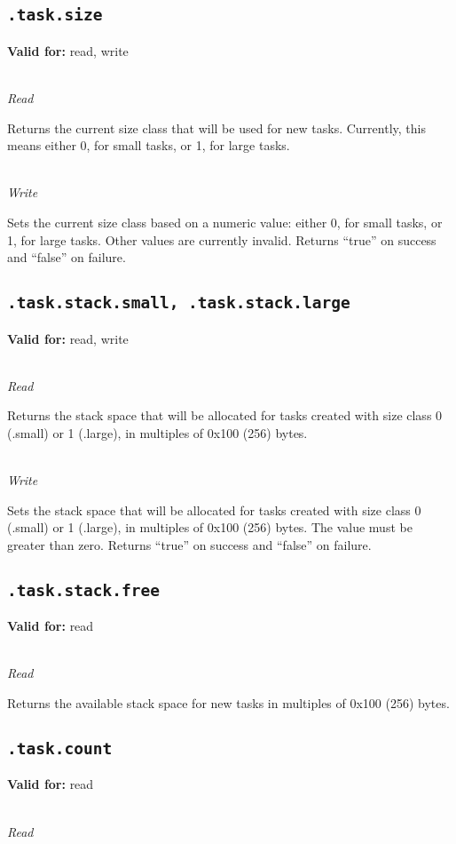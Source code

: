 \documentclass{article}
\begin{document}
\subsection{\texttt{.task.size}}
\textbf{Valid for:} read, write

~\\
\textit{Read}

Returns the current size class that will be used for new tasks. Currently, this means either 0, for small tasks, or 1, for large tasks.

~\\
\textit{Write}

Sets the current size class based on a numeric value: either 0, for small tasks, or 1, for large tasks. Other values are currently invalid.
Returns ``true'' on success and ``false'' on failure.

\subsection{\texttt{.task.stack.small, .task.stack.large}}
\textbf{Valid for:} read, write

~\\
\textit{Read}

Returns the stack space that will be allocated for tasks created with size class 0 (.small) or 1 (.large), in multiples of 0x100 (256) bytes.

~\\
\textit{Write}

Sets the stack space that will be allocated for tasks created with size class 0 (.small) or 1 (.large), in multiples of 0x100 (256) bytes. The value must be greater than zero.
Returns ``true'' on success and ``false'' on failure.

\subsection{\texttt{.task.stack.free}}
\textbf{Valid for:} read

~\\
\textit{Read}

Returns the available stack space for new tasks in multiples of 0x100 (256) bytes.

\subsection{\texttt{.task.count}}
\textbf{Valid for:} read

~\\
\textit{Read}
\end{document}
